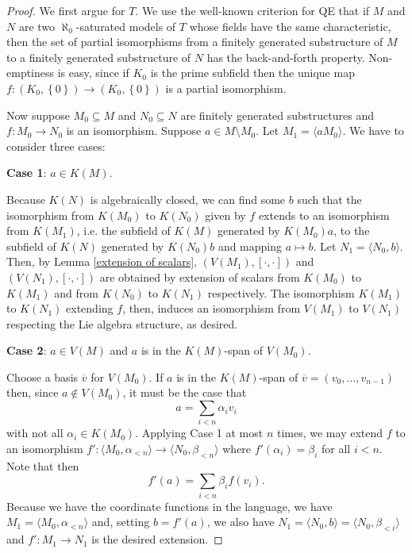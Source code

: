 \documentclass[10pt,a4paper]{amsart}
\newcommand{\set}[1]{\left\{ {#1} \right\}}
\begin{document}
\begin{proof}
We first argue for $T$.  We use the well-known criterion for QE that if $M$ and $N$ are two $\aleph_{0}$-saturated models of $T$ whose fields have the same characteristic, then the set of partial isomorphisms from a finitely generated substructure of $M$ to a finitely generated substructure of $N$ has the back-and-forth property. Non-emptiness is easy, since if $K_{0}$ is the prime subfield then the unique map $f:(K_{0},\set{0})\to (K_{0},\set{0})$ is a partial isomorphism. 

Now suppose $M_{0} \subseteq M$ and $N_{0} \subseteq N$ are finitely generated substructures and $f : M_{0} \to N_{0}$ is an isomorphism. Suppose $a \in M \setminus M_{0}$.  Let $M_{1} = \langle a M_{0} \rangle$. We have to consider three cases:

\textbf{Case 1}:  $a \in K(M)$.  

Because $K(N)$ is algebraically closed, we can find some $b$ such that the isomorphism from $K(M_{0})$ to $K(N_{0})$ given by $f$ extends to an isomorphism from $K(M_{1})$, i.e. the subfield of $K(M)$ generated by $K(M_{0})a$, to the subfield of $K(N)$ generated by $K(N_{0})b$ and mapping $a \mapsto b$.  Let $N_{1} = \langle N_{0},b \rangle$.  Then, by Lemma \ref{extension of scalars}, $(V(M_{1}), [\cdot,\cdot])$ and $(V(N_{1}), [\cdot,\cdot])$ are obtained by extension of scalars from $K(M_{0})$ to $K(M_{1})$ and from $K(N_{0})$ to $K(N_{1})$ respectively.  The isomorphism $K(M_{1})$ to $K(N_{1})$ extending $f$, then, induces an isomorphism from $V(M_{1})$ to $V(N_{1})$ respecting the Lie algebra structure, as desired. 

\textbf{Case 2}: $a \in V(M)$ and $a$ is in the $K(M)$-span of $V(M_{0})$.  

Choose a basis $\overline{v}$ for $V(M_{0})$.  If $a$ is in the $K(M)$-span of $\overline{v} = (v_{0}, \ldots, v_{n-1})$ then, since $a \not\in V(M_{0})$, it must be the case that 
$$
a = \sum_{i < n} \alpha_{i} v_{i}
$$
with not all $\alpha_{i} \in K(M_{0})$.  Applying Case 1 at most $n$ times, we may extend $f$ to an isomorphism $f': \langle M_{0}, \alpha_{<n} \rangle \to \langle N_{0}, \beta_{<n} \rangle$ where $f'(\alpha_{i}) = \beta_{i}$ for all $i < n$.  Note that then
$$
f'(a) = \sum_{i < n} \beta_{i}f(v_{i}).
$$
Because we have the coordinate functions in the language, we have $M_{1} = \langle M_{0}, \alpha_{<n}\rangle$ and, setting $b = f'(a)$, we also have $N_{1} = \langle N_{0},b \rangle = \langle N_{0}, \beta_{<i} \rangle$ and $f' :M_{1} \to N_{1}$ is the desired extension. 


\end{proof}
\end{document}

